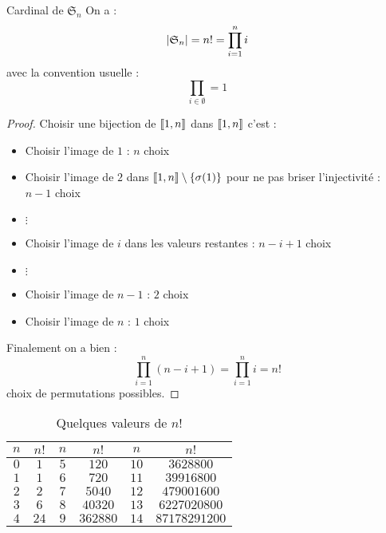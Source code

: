 \documentclass{cours}
\begin{document}
\begin{propositionfr}{Cardinal de $\mathfrak{S}_{n}$}{}
    On a\! :
    \[
        \left|\mathfrak{S}_{n}\right| = n! = \prod_{i = 1}^{n} i
    \]
    avec la convention usuelle\! :
    \[
        \prod_{i \in \emptyset} = 1
    \]
\end{propositionfr}
\begin{proof}
    Choisir une bijection de $\left\llbracket 1, n\right\rrbracket$ dans $\left\llbracket 1, n\right\rrbracket$ c'est\! :
    \begin{itemize}
        \item Choisir l'image de $1$\! : $n$ choix
        \item Choisir l'image de $2$ dans $\left\llbracket 1, n\right\rrbracket\setminus \left\{\sigma(1)\right\}$ pour ne pas briser l'injectivité\! : $n - 1$ choix
        \item $\vdots$
        \item Choisir l'image de $i$ dans les valeurs restantes\! : $n - i + 1$ choix
        \item $\vdots$
        \item Choisir l'image de $n - 1$\! : $2$ choix
        \item Choisir l'image de $n$\! : $1$ choix
    \end{itemize}
    Finalement on a bien\! :
    \[
        \prod_{i = 1}^{n} (n - i + 1) = \prod_{i = 1}^{n} i = n!
    \]
    choix de permutations possibles.
\end{proof}

\begin{table}
    \begin{center}
        \begin{tabular}{cc|cc|cc}
            \toprule
            $n$ & $n!$ & $n$ & $n!$     & $n$  & $n!$          \\
            \midrule
            $0$ & $1$  & $5$ & $120$    & $10$ & $3628800$     \\
            $1$ & $1$  & $6$ & $720$    & $11$ & $39916800$    \\
            $2$ & $2$  & $7$ & $5040$   & $12$ & $479001600$   \\
            $3$ & $6$  & $8$ & $40320$  & $13$ & $6227020800$  \\
            $4$ & $24$ & $9$ & $362880$ & $14$ & $87178291200$ \\
            \bottomrule
        \end{tabular}
    \end{center}
    \caption{Quelques valeurs de $n!$}
\end{table}
\end{document}
